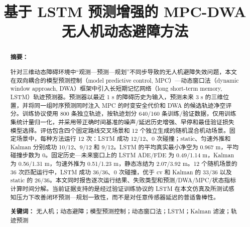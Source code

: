 \documentclass[11pt,a4paper]{ctexart}
\title{基于 LSTM 预测增强的 MPC-DWA 无人机动态避障方法}
\author{}
\date{}
\begin{document}
\maketitle
\begin{abstract}
\noindent\textbf{摘要：}

针对三维动态障碍环境中“观测—预测—规划”不同步导致的无人机避障失效问题，本文在双向耦合的模型预测控制（model predictive control, MPC）—动态窗口法（dynamic window approach, DWA）框架中引入长短期记忆网络（long short-term memory, LSTM）轨迹预测器。预测器以最近 1 s 的障碍历史为输入，预测未来 3 s 的三维位置，并将同一组时序预测同时注入 MPC 的时变安全代价和 DWA 的候选轨迹净空评分。训练协议使用 800 条独立轨迹，按轨迹划分 640/160 条训练/验证数据，仅用训练集统计量归一化，并采用带正确时间基准的噪声/延迟历史增强、早停和最佳验证损失模型选择。评估包含四个固定路线交叉场景和 12 个独立生成的随机混合机动场景。固定场景中，每种方法运行 12 次：LSTM 成功 12/12、0 次碰撞；static、匀速外推和 Kalman 分别成功 10/12、9/12 和 9/12。LSTM 的平均真实最小净空为 0.967 m，平均碰撞步数为 0。固定历史—未来窗口上的 LSTM ADE/FDE 为 0.49/1.14 m，Kalman 为 0.56/1.31 m，匀速外推为 0.51/1.23 m，静态冻结为 2.07/3.92 m。12 个随机场景的 36 次匹配运行中，LSTM 成功 36/36、0 次碰撞，优于 cv 和 Kalman 的 33/36 以及 static 的 26/36。本文同时报告逐次运行结果、失败类型和预测/DWA/MPC/状态指标计算时间分解。当前证据支持的是经过验证训练协议的 LSTM 在本文仿真及所测试感知压力下改善闭环预测—规划一致性，而不是对任意传感器延迟的普适鲁棒性。

\noindent\textbf{关键词：} 无人机；动态避障；模型预测控制；动态窗口法；LSTM；Kalman 滤波；轨迹预测

\end{abstract}
\end{document}

